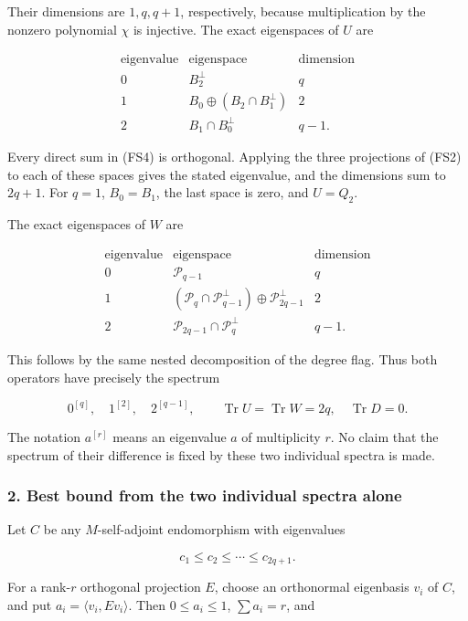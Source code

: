 Their dimensions are \(1,q,q+1\), respectively, because multiplication by the nonzero polynomial \(\chi\) is injective. The exact eigenspaces of \(U\) are

\[
\begin{array}{c|c|c}
\text{eigenvalue}&\text{eigenspace}&\text{dimension}\\\hline
0&B_2^\perp&q\\
1&B_0\oplus(B_2\cap B_1^\perp)&2\\
2&B_1\cap B_0^\perp&q-1.
\end{array}
\tag{FS4}
\]

Every direct sum in (FS4) is orthogonal. Applying the three projections of (FS2) to each of these spaces gives the stated eigenvalue, and the dimensions sum to \(2q+1\). For \(q=1\), \(B_0=B_1\), the last space is zero, and \(U=Q_2\).

The exact eigenspaces of \(W\) are

\[
\begin{array}{c|c|c}
\text{eigenvalue}&\text{eigenspace}&\text{dimension}\\\hline
0&\mathcal P_{q-1}&q\\
1&(\mathcal P_q\cap\mathcal P_{q-1}^\perp)\oplus\mathcal P_{2q-1}^\perp&2\\
2&\mathcal P_{2q-1}\cap\mathcal P_q^\perp&q-1.
\end{array}
\tag{FS5}
\]

This follows by the same nested decomposition of the degree flag. Thus both operators have precisely the spectrum

\[
0^{[q]},\quad1^{[2]},\quad2^{[q-1]},
\qquad \operatorname{Tr}U=\operatorname{Tr}W=2q,
\quad \operatorname{Tr}D=0.
\tag{FS6}
\]

The notation \(a^{[r]}\) means an eigenvalue \(a\) of multiplicity \(r\). No claim that the spectrum of their difference is fixed by these two individual spectra is made.

\subsubsection{2. Best bound from the two individual spectra alone}\label{endpoint-four_window_sharpness--best-bound-from-the-two-individual-spectra-alone}

Let \(C\) be any \(M\)-self-adjoint endomorphism with eigenvalues

\[
c_1\le c_2\le\cdots\le c_{2q+1}.
\tag{FS7}
\]

For a rank-\(r\) orthogonal projection \(E\), choose an orthonormal eigenbasis \(v_i\) of \(C\), and put \(a_i=\langle v_i,Ev_i\rangle\). Then \(0\le a_i\le1\), \(\sum a_i=r\), and

